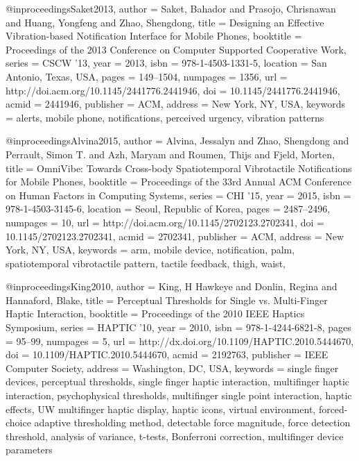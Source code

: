 @inproceedings{Saket2013,
 author = {Saket, Bahador and Prasojo, Chrisnawan and Huang, Yongfeng and Zhao, Shengdong},
 title = {{Designing an Effective Vibration-based Notification Interface for Mobile Phones}},
 booktitle = {Proceedings of the 2013 Conference on Computer Supported Cooperative Work},
 series = {CSCW '13},
 year = {2013},
 isbn = {978-1-4503-1331-5},
 location = {San Antonio, Texas, USA},
 pages = {149--1504},
 numpages = {1356},
 url = {http://doi.acm.org/10.1145/2441776.2441946},
 doi = {10.1145/2441776.2441946},
 acmid = {2441946},
 publisher = {ACM},
 address = {New York, NY, USA},
 keywords = {alerts, mobile phone, notifications, perceived urgency, vibration patterns}
} 

@inproceedings{Alvina2015,
 author = {Alvina, Jessalyn and Zhao, Shengdong and Perrault, Simon T. and Azh, Maryam and Roumen, Thijs and Fjeld, Morten},
 title = {{OmniVibe: Towards Cross-body Spatiotemporal Vibrotactile Notifications for Mobile Phones}},
 booktitle = {Proceedings of the 33rd Annual ACM Conference on Human Factors in Computing Systems},
 series = {CHI '15},
 year = {2015},
 isbn = {978-1-4503-3145-6},
 location = {Seoul, Republic of Korea},
 pages = {2487--2496},
 numpages = {10},
 url = {http://doi.acm.org/10.1145/2702123.2702341},
 doi = {10.1145/2702123.2702341},
 acmid = {2702341},
 publisher = {ACM},
 address = {New York, NY, USA},
 keywords = {arm, mobile device, notification, palm, spatiotemporal vibrotactile pattern, tactile feedback, thigh, waist},
} 

@inproceedings{King2010,
 author = {King, H Hawkeye and Donlin, Regina and Hannaford, Blake},
 title = {{Perceptual Thresholds for Single vs. Multi-Finger Haptic Interaction}},
 booktitle = {Proceedings of the 2010 IEEE Haptics Symposium},
 series = {HAPTIC '10},
 year = {2010},
 isbn = {978-1-4244-6821-8},
 pages = {95--99},
 numpages = {5},
 url = {http://dx.doi.org/10.1109/HAPTIC.2010.5444670},
 doi = {10.1109/HAPTIC.2010.5444670},
 acmid = {2192763},
 publisher = {IEEE Computer Society},
 address = {Washington, DC, USA},
 keywords = {single finger devices, perceptual thresholds, single finger haptic interaction, multifinger haptic interaction, psychophysical thresholds, multifinger single point interaction, haptic effects, UW multifinger haptic display, haptic icons, virtual environment, forced-choice adaptive thresholding method, detectable force magnitude, force detection threshold, analysis of variance, t-tests, Bonferroni correction, multifinger device parameters}
} 

